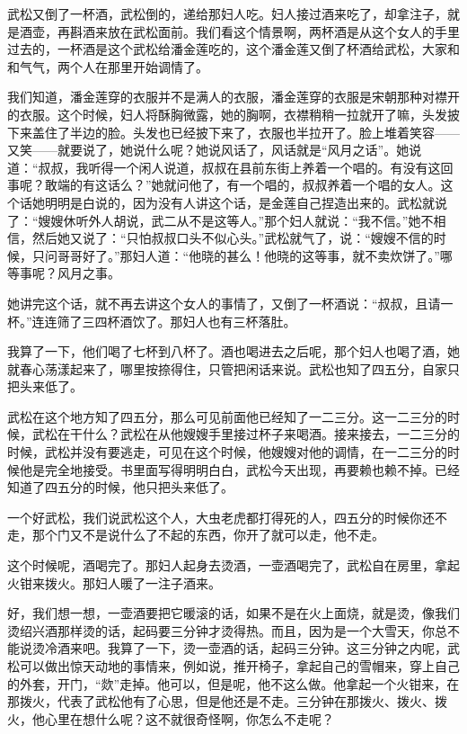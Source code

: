 \par 武松又倒了一杯酒，武松倒的，递给那妇人吃。妇人接过酒来吃了，却拿注子，就是酒壶，再斟酒来放在武松面前。我们看这个情景啊，两杯酒是从这个女人的手里过去的，一杯酒是这个武松给潘金莲吃的，这个潘金莲又倒了杯酒给武松，大家和和气气，两个人在那里开始调情了。
\par 我们知道，潘金莲穿的衣服并不是满人的衣服，潘金莲穿的衣服是宋朝那种对襟开的衣服。这个时候，妇人将酥胸微露，她的胸啊，衣襟稍稍一拉就开了嘛，头发披下来盖住了半边的脸。头发也已经披下来了，衣服也半拉开了。脸上堆着笑容——又笑——就要说了，她说什么呢？她说风话了，风话就是“风月之话”。她说道：“叔叔，我听得一个闲人说道，叔叔在县前东街上养着一个唱的。有没有这回事呢？敢端的有这话么？”她就问他了，有一个唱的，叔叔养着一个唱的女人。这个话她明明是白说的，因为没有人讲这个话，是金莲自己捏造出来的。武松就说了：“嫂嫂休听外人胡说，武二从不是这等人。”那个妇人就说：“我不信。”她不相信，然后她又说了：“只怕叔叔口头不似心头。”武松就气了，说：“嫂嫂不信的时候，只问哥哥好了。”那妇人道：“他晓的甚么！他晓的这等事，就不卖炊饼了。”哪等事呢？风月之事。
\par 她讲完这个话，就不再去讲这个女人的事情了，又倒了一杯酒说：“叔叔，且请一杯。”连连筛了三四杯酒饮了。那妇人也有三杯落肚。
\par 我算了一下，他们喝了七杯到八杯了。酒也喝进去之后呢，那个妇人也喝了酒，她就春心荡漾起来了，哪里按捺得住，只管把闲话来说。武松也知了四五分，自家只把头来低了。
\par 武松在这个地方知了四五分，那么可见前面他已经知了一二三分。这一二三分的时候，武松在干什么？武松在从他嫂嫂手里接过杯子来喝酒。接来接去，一二三分的时候，武松并没有要逃走，可见在这个时候，他嫂嫂对他的调情，在一二三分的时候他是完全地接受。书里面写得明明白白，武松今天出现，再要赖也赖不掉。已经知道了四五分的时候，他只把头来低了。
\par 一个好武松，我们说武松这个人，大虫老虎都打得死的人，四五分的时候你还不走，那个门又不是说什么了不起的东西，你开了就可以走，他不走。
\par 这个时候呢，酒喝完了。那妇人起身去烫酒，一壶酒喝完了，武松自在房里，拿起火钳来拨火。那妇人暖了一注子酒来。
\par 好，我们想一想，一壶酒要把它暖滚的话，如果不是在火上面烧，就是烫，像我们烫绍兴酒那样烫的话，起码要三分钟才烫得热。而且，因为是一个大雪天，你总不能说烫冷酒来吧。我算了一下，烫一壶酒的话，起码三分钟。这三分钟之内呢，武松可以做出惊天动地的事情来，例如说，推开椅子，拿起自己的雪帽来，穿上自己的外套，开门，“欻”走掉。他可以，但是呢，他不这么做。他拿起一个火钳来，在那拨火，代表了武松他有了心思，但是他还是不走。三分钟在那拨火、拨火、拨火，他心里在想什么呢？这不就很奇怪啊，你怎么不走呢？
